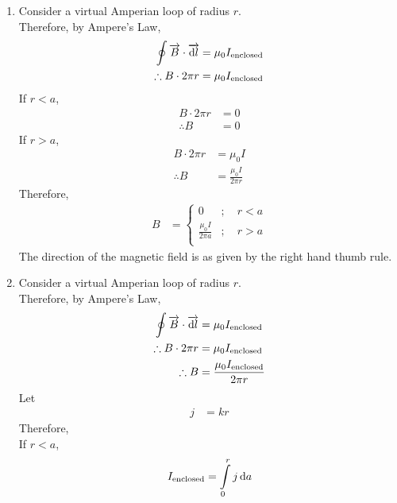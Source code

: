 \documentclass[fleqn, a4paper, 11pt, oneside]{amsart}
\theoremstyle{definition}
\theoremstyle{theorem}
\begin{document}
\begin{solution}
	\begin{enumerate}[leftmargin = *]
		\item
			Consider a virtual Amperian loop of radius $r$.\\
			Therefore, by Ampere's Law,
			\begin{align*}
				\oint \overrightarrow{B} \cdot \overrightarrow{\dif l} & = \mu_0 I_{\textnormal{enclosed}} \\
				\therefore B \cdot 2 \pi r                             & = \mu_0 I_{\textnormal{enclosed}}
			\end{align*}
			If $r < a$,
			\begin{align*}
				B \cdot 2 \pi r & = 0 \\
				\therefore B    & = 0
			\end{align*}
			If $r > a$,
			\begin{align*}
				B \cdot 2 \pi r & = \mu_0 I \\
				\therefore B    & = \frac{\mu_0 I}{2 \pi r}
			\end{align*}
			Therefore,
			\begin{align*}
				B &=
					\begin{cases}
						0                       & ;\quad r < a \\
						\frac{\mu_0 I}{2 \pi a} & ;\quad r > a \\
					\end{cases}
			\end{align*}
			The direction of the magnetic field is as given by the right hand thumb rule.
		\item
			Consider a virtual Amperian loop of radius $r$.\\
			Therefore, by Ampere's Law,
			\begin{align*}
				\oint \overrightarrow{B} \cdot \overrightarrow{\dif l} & = \mu_0 I_{\textnormal{enclosed}} \\
				\therefore B \cdot 2 \pi r                             & = \mu_0 I_{\textnormal{enclosed}} \\
				\therefore B                                           & = \frac{\mu_0 I_{\textnormal{enclosed}}}{2 \pi r}
			\end{align*}
			Let
			\begin{align*}
				j & = k r
			\end{align*}
			Therefore,\\
			If $r < a$,
			\begin{align*}
				I_{\textnormal{enclosed}} & = \int\limits_{0}^{r} j \dif a                 \\

\end{align*}
\end{enumerate}
\end{solution}
\end{document}
